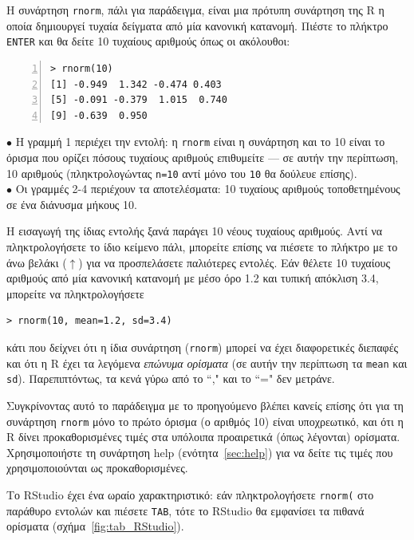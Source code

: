 \documentclass[a4paper,10pt,twocolumn]{article}
\makeatletter
\let\SF@@footnote\footnote
\def\footnote{\ifx\protect\@typeset@protect
 \expandafter\SF@@footnote
 \else
 \expandafter\SF@gobble@opt
 \fi
}
\edef\SF@gobble@opt{\noexpand\protect
 \expandafter\noexpand\csname SF@gobble@opt \endcsname}
\makeatother
\begin{document}
Η συνάρτηση \texttt{rnorm}, πάλι για παράδειγμα, είναι μια πρότυπη συνάρτηση της R η οποία δημιουργεί
τυχαία δείγματα από μία κανονική κατανομή. Πιέστε το πλήκτρο \texttt{ENTER} και θα δείτε 10 τυχαίους αριθμούς
όπως οι ακόλουθοι:

\begin{Verbatim}[frame=single,numbers=left,gobble=0, xleftmargin=0.35cm, numbersep=0.1cm]
> rnorm(10)
[1] -0.949  1.342 -0.474 0.403 
[5] -0.091 -0.379  1.015  0.740 
[9] -0.639  0.950
\end{Verbatim}

\noindent $\bullet$ Η γραμμή 1 περιέχει την εντολή: η \texttt{rnorm} είναι η συνάρτηση και το 10 είναι το όρισμα
που ορίζει πόσους τυχαίους αριθμούς επιθυμείτε --- σε αυτήν την περίπτωση, 10 αριθμούς (πληκτρολογώντας
\texttt{n=10} αντί μόνο του \texttt{10} θα δούλευε επίσης).\\
\noindent $\bullet$ Οι γραμμές 2-4 περιέχουν τα αποτελέσματα: 10 τυχαίους αριθμούς τοποθετημένους σε ένα
διάνυσμα μήκους 10.

Η εισαγωγή της ίδιας εντολής ξανά παράγει 10 νέους τυχαίους αριθμούς. Αντί να πληκτρολογήσετε το ίδιο κείμενο 
πάλι, μπορείτε επίσης να πιέσετε το πλήκτρο με το άνω βελάκι ($\uparrow$) για να προσπελάσετε παλιότερες 
εντολές. Εάν θέλετε 10 τυχαίους αριθμούς από μία κανονική κατανομή με μέσο όρο 1.2 και τυπική απόκλιση 3.4,
μπορείτε να πληκτρολογήσετε
\begin{Verbatim}[frame=single,gobble=0]
> rnorm(10, mean=1.2, sd=3.4)
\end{Verbatim}
κάτι που δείχνει ότι η ίδια συνάρτηση (\texttt{rnorm}) μπορεί να έχει διαφορετικές διεπαφές και ότι η R έχει
τα λεγόμενα \emph{επώνυμα ορίσματα}  (σε αυτήν την περίπτωση τα \texttt{mean} και \texttt{sd}). Παρεπιπτόντως,
τα κενά γύρω από το ``," και το ``=" δεν μετράνε.

Συγκρίνοντας αυτό το παράδειγμα με το προηγούμενο βλέπει κανείς επίσης ότι για τη συνάρτηση \texttt{rnorm}
μόνο το πρώτο όρισμα (ο αριθμός 10) είναι υποχρεωτικό, και ότι η R δίνει προκαθορισμένες τιμές στα υπόλοιπα
προαιρετικά (όπως λέγονται) ορίσματα.\footnote{Χρησιμοποιήστε τη συνάρτηση help (ενότητα~\ref{sec:help}) για να
δείτε τις τιμές που χρησιμοποιούνται ως προκαθορισμένες.} 

Το RStudio έχει ένα ωραίο χαρακτηριστικό: εάν πληκτρολογήσετε \verb!rnorm(! στο παράθυρο εντολών και πιέσετε
\texttt{TAB}, τότε το RStudio θα εμφανίσει τα πιθανά ορίσματα (σχήμα~\ref{fig:tab_RStudio}).

\end{document}
